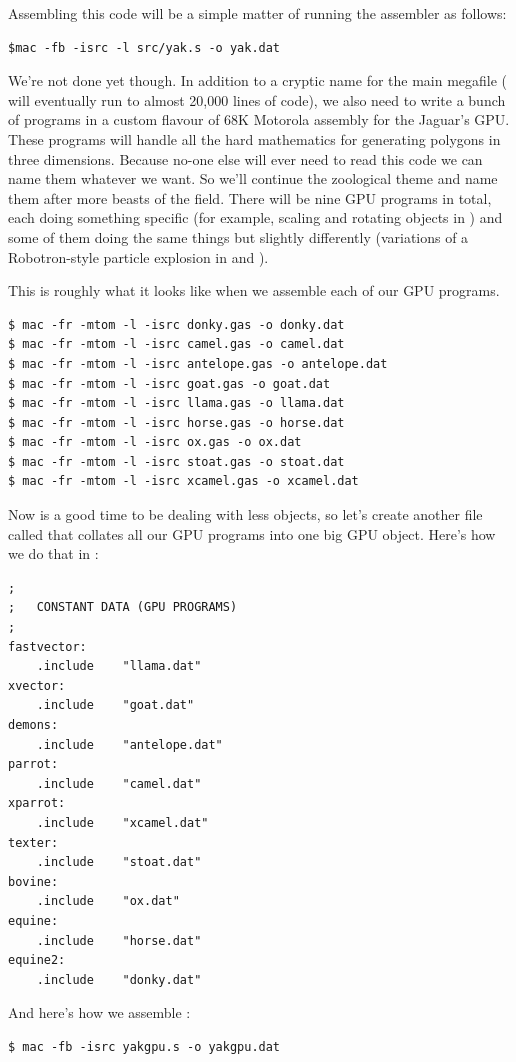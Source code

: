 Assembling this code will be a simple matter of running the  assembler as follows:

\begin{lstlisting}
$mac -fb -isrc -l src/yak.s -o yak.dat
\end{lstlisting}

We're not done yet though.
In addition to a cryptic name for the main megafile ( will eventually run to almost 20,000
lines of code), we also need to write a bunch of programs in a custom flavour of 68K Motorola assembly for
the Jaguar's GPU. These programs will handle all the hard mathematics for generating polygons in three
dimensions. Because no-one else will ever need to read this code we can name them whatever we want. So
we'll continue the zoological theme and name them after more beasts of the field. There will be nine GPU
programs in total, each doing something specific (for example, scaling and rotating objects in ) 
and some of them doing the same things but slightly differently (variations of a Robotron-style particle
explosion in  and ).

This is roughly what it looks like when we assemble each of our GPU programs.
\begin{lstlisting}
$ mac -fr -mtom -l -isrc donky.gas -o donky.dat
$ mac -fr -mtom -l -isrc camel.gas -o camel.dat
$ mac -fr -mtom -l -isrc antelope.gas -o antelope.dat
$ mac -fr -mtom -l -isrc goat.gas -o goat.dat
$ mac -fr -mtom -l -isrc llama.gas -o llama.dat
$ mac -fr -mtom -l -isrc horse.gas -o horse.dat
$ mac -fr -mtom -l -isrc ox.gas -o ox.dat
$ mac -fr -mtom -l -isrc stoat.gas -o stoat.dat
$ mac -fr -mtom -l -isrc xcamel.gas -o xcamel.dat
\end{lstlisting}

Now is a good time to be dealing with less objects, so let's create another file called  that
collates all our GPU programs into one big GPU object. Here's how we do that in :

\begin{lstlisting}
;
;	CONSTANT DATA (GPU PROGRAMS)
;
fastvector:
	.include	"llama.dat"
xvector:
	.include 	"goat.dat"
demons:
	.include	"antelope.dat"
parrot:
	.include	"camel.dat"
xparrot:
	.include	"xcamel.dat"
texter:
	.include 	"stoat.dat"
bovine:
	.include	"ox.dat"
equine:
	.include 	"horse.dat"
equine2:
	.include 	"donky.dat"
\end{lstlisting}

And here's how we assemble :
\begin{lstlisting}
$ mac -fb -isrc yakgpu.s -o yakgpu.dat
\end{lstlisting}

